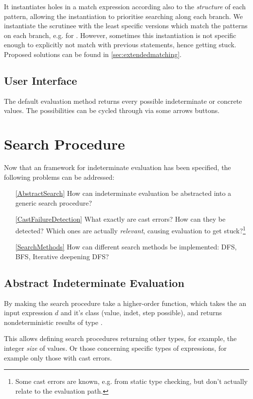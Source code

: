 It instantiates holes in a match expression according also to the \textit{structure} of each pattern, allowing the instantiation to prioritise searching along each branch. We instantiate the scrutinee with the least specific versions which match the patterns on each branch, e.g.  for . However, sometimes this instantiation is not specific enough to explicitly not match with previous statements, hence getting stuck. Proposed solutions can be found in \cref{sec:extendedmatching}.

\subsection{User Interface}\label{sec:UIIndetEval}
The default evaluation method returns every possible indeterminate or concrete values. The possibilities can be cycled through via some arrows buttons.

\section{Search Procedure}\label{sec:SearchProcedure}
Now that an framework for indeterminate evaluation has been specified, the following problems can be addressed:
\begin{itemize}
\item[\ref{AbstractSearch}] How can indeterminate evaluation be abstracted into a generic search procedure?
\item[\ref{CastFailureDetection}] What exactly are cast errors? How can they be detected? Which ones are actually \textit{relevant}, causing evaluation to get stuck?\footnote{Some cast errors are known, e.g. from static type checking, but don't actually relate to the evaluation path.}
\item[\ref{SearchMethods}] How can different search methods be implemented: DFS, BFS, Iterative deepening DFS? 
\end{itemize}

\subsection{Abstract Indeterminate Evaluation}
\label{sec:AbstractSearch}
By making the search procedure take a higher-order  function, which takes the an input expression $d$ and it's class (value, indet, step possible), and returns nondeterministic results of type .

This allows defining search procedures returning other types, for example, the integer \textit{size} of values. Or those concerning specific types of expressions, for example only those with cast errors. 


